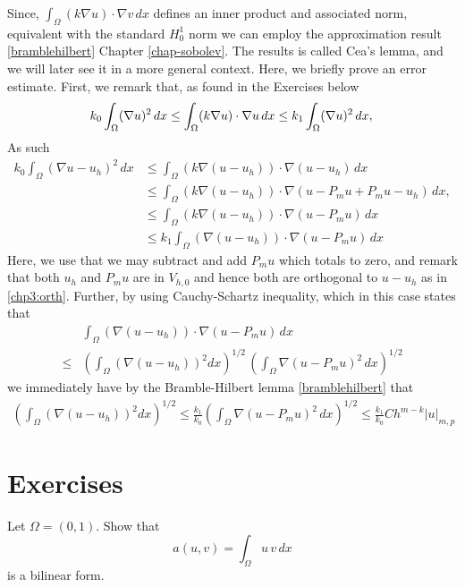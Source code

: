 Since, $\int_\Omega (k \nabla u) \cdot \nabla v \, dx$ defines an inner product and associated norm, equivalent with 
the standard $H^1_0$ norm we can employ the approximation result \eqref{bramblehilbert} Chapter \ref{chap-sobolev}. 
The results is called Cea's lemma, and we will later see it in a more general context. 
Here, we briefly prove an error estimate. First, we remark that, as found in the Exercises below  
\[
k_0 \int_\Omega (\nabla u)^2  \, dx \le   \int_\Omega (k \nabla u) \cdot \nabla u \, dx \le   
k_1 \int_\Omega (\nabla u)^2  \, dx,  \\  
\]
As such 
\begin{align*}
k_0 \int_\Omega (\nabla u-u_h)^2  \, dx &\le   \int_\Omega (k \nabla (u -u_h)) \cdot \nabla (u-u_h) \, dx \\    
&\le   \int_\Omega (k \nabla (u -u_h)) \cdot \nabla (u-P_m u + P_m u - u_h) \, dx, \\ 
&\le   \int_\Omega (k \nabla (u -u_h)) \cdot \nabla (u-P_m u ) \, dx \\ 
&\le   k_1 \int_\Omega (\nabla (u -u_h)) \cdot \nabla (u-P_m u ) \, dx 
\end{align*}
Here, we use that we may subtract and add $P_m u$ which totals to zero, and remark that both $u_h$ and $P_m u$ 
are in $V_{h,0}$ and hence both are orthogonal to $u - u_h$ as in \eqref{chp3:orth}. 
Further, by using Cauchy-Schartz inequality, which in this case states that   
\begin{align*}
&  \int_\Omega ( \nabla (u -u_h)) \cdot \nabla (u-P_m u ) \, dx \\ \le  
&  
(\int_\Omega ( \nabla (u -u_h))^{2} dx )^{1/2} \,  (\int_\Omega \nabla (u-P_m u )^2 \, dx)^{1/2} 
\end{align*}
we immediately have by the Bramble-Hilbert lemma \eqref{bramblehilbert} that 
\begin{align}
(\int_\Omega ( \nabla (u -u_h))^{2} dx )^{1/2} \le \frac{k_1}{k_0}   (\int_\Omega \nabla (u-P_m u )^2 \, dx)^{1/2} 
 \le \frac{k_1}{k_0}  C h^{m-k} |u|_{m,p} 
\end{align}


\section{Exercises}

\begin{exercise}
\label{ex:bilinear}
Let $\Omega=(0,1)$.  
Show that 
\[  
a(u, v) = \int_\Omega  u \, v \, dx 
\]
is a bilinear form. 
\end{exercise}

